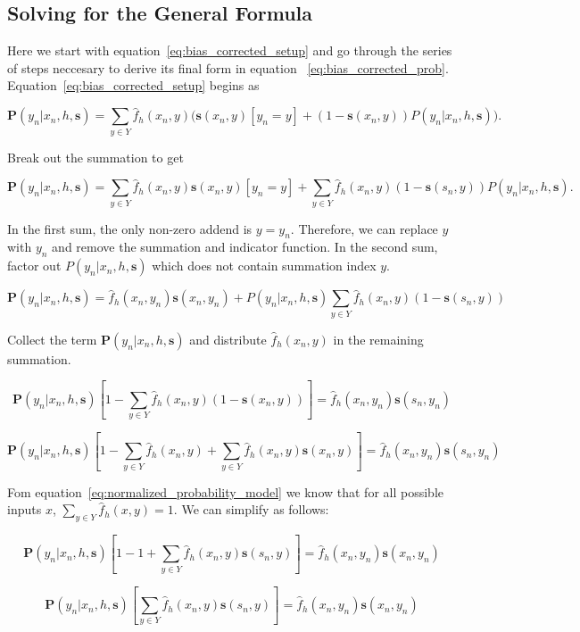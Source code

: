 \documentclass[twoside]{article}
\begin{document}
\begin{appendices}

\section{Solving for the General Formula}
\label{appendix:solving}

Here we start with equation~\eqref{eq:bias_corrected_setup} and go through the series of steps neccesary to derive its final form in equation ~\eqref{eq:bias_corrected_prob}. Equation~\eqref{eq:bias_corrected_setup} begins as

\[\mathbf{P}(y_n|x_n,h,\mathbf{s})=\sum_{y \in Y}\hat{f}_h(x_n,y)\big(\mathbf{s}(x_n,y)\left [y_n = y\right ] + (1-\mathbf{s}(x_n,y))P(y_n|x_n,h,\mathbf{s})\big).\]

Break out the summation to get

\[\mathbf{P}(y_n|x_n,h,\mathbf{s})=\sum_{y \in Y}\hat{f}_h(x_n,y)\mathbf{s}(x_n,y)\left [y_n = y\right ] +\sum_{y \in Y}\hat{f}_h(x_n,y)(1-\mathbf{s}(s_n,y))P(y_n|x_n,h,\mathbf{s}).\]

In the first sum, the only non-zero addend is \(y = y_n\). Therefore, we can replace \(y\) with \(y_n\) and remove the summation and indicator function. In the second sum, factor out \(P(y_n|x_n,h,\mathbf{s})\) which does not contain summation index \(y\).

\[\mathbf{P}(y_n|x_n,h,\mathbf{s})=\hat{f}_h(x_n,y_n)\mathbf{s}(x_n,y_n) +P(y_n|x_n,h,\mathbf{s})\sum_{y \in Y}\hat{f}_h(x_n,y)(1-\mathbf{s}(s_n,y))\]

Collect the term \(\mathbf{P}(y_n|x_n,h,\mathbf{s})\) and distribute \(\hat{f}_h(x_n,y)\) in the remaining summation.

\[\mathbf{P}(y_n|x_n,h,\mathbf{s})\left [ 1 - \sum_{y \in Y}\hat{f}_h(x_n,y)(1-\mathbf{s}(x_n,y)) \right ]=\hat{f}_h(x_n,y_n)\mathbf{s}(s_n,y_n) \]

\[\mathbf{P}(y_n|x_n,h,\mathbf{s})\left [ 1 - \sum_{y \in Y}\hat{f}_h(x_n,y)+\sum_{y \in Y}\hat{f}_h(x_n,y)\mathbf{s}(x_n,y) \right ]=\hat{f}_h(x_n,y_n)\mathbf{s}(s_n,y_n) \]

Fom equation~\eqref{eq:normalized_probability_model} we know that for all possible inputs \(x\), \(\sum_{y \in Y} \hat{f}_h(x, y) = 1\). We can simplify as follows:

\[\mathbf{P}(y_n|x_n,h,\mathbf{s})\left [ 1 - 1+\sum_{y \in Y}\hat{f}_h(x_n,y)\mathbf{s}(s_n,y) \right ]=\hat{f}_h(x_n,y_n)\mathbf{s}(x_n,y_n) \]

\[\mathbf{P}(y_n|x_n,h,\mathbf{s})\left [\sum_{y \in Y}\hat{f}_h(x_n,y)\mathbf{s}(s_n,y) \right ]=\hat{f}_h(x_n,y_n)\mathbf{s}(x_n,y_n) \]


\end{appendices}
\end{document}
